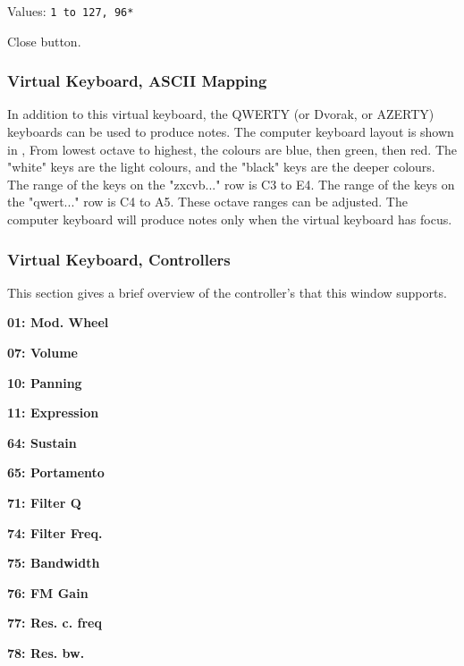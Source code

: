    Values: \texttt{1 to 127, 96*}

   Close button.

\subsubsection{Virtual Keyboard, ASCII Mapping}
\label{subsubsec:virtual_keyboard_ascii}

   In addition to this virtual keyboard, the QWERTY (or Dvorak, or AZERTY)
   keyboards can be used to produce notes.
   The computer keyboard layout is shown in
   ,
   From lowest octave to highest, the colours are blue, then green, then red.
   The "white" keys are the light colours, and the "black" keys are the
   deeper colours.
   The range of the keys on the "zxcvb..." row is C3 to E4.
   The range of the keys on the "qwert..." row is C4 to A5.
   These octave ranges can be adjusted.
   The computer keyboard will produce notes only when the virtual keyboard
   has focus.

\subsubsection{Virtual Keyboard, Controllers}
\label{subsubsec:virtual_keyboard_controllers}

   This section gives a brief overview of the controller's that this
   window supports.

   \begin{enumber}
      \item \textbf{01: Mod. Wheel}
      \item \textbf{07: Volume}
      \item \textbf{10: Panning}
      \item \textbf{11: Expression}
      \item \textbf{64: Sustain}
      \item \textbf{65: Portamento}
      \item \textbf{71: Filter Q}
      \item \textbf{74: Filter Freq.}
      \item \textbf{75: Bandwidth}
      \item \textbf{76: FM Gain}
      \item \textbf{77: Res. c. freq}
      \item \textbf{78: Res. bw.}
   \end{enumber}

